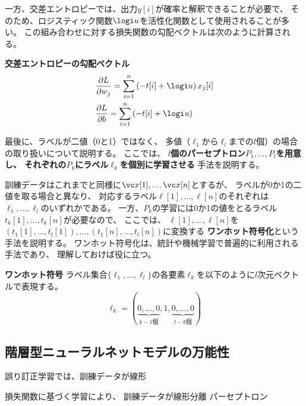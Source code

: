 一方、交差エントロピーでは、出力$y[i]$が確率と解釈できることが必要で、
そのため、ロジスティック関数$\logi u$を活性化関数として使用されることが多い。
この組み合わせに対する損失関数の勾配ベクトルは次のように計算される。
\begin{itembox}{\bf 交差エントロピーの勾配ベクトル}
  \begin{align*}
    &
    \frac{\partial L}{\partial w_j} = \sum_{i=1}^n \left(-t[i] + \logi u\right)x_j[i]
    \\&
    \frac{\partial L}{\partial b} = \sum_{i=1}^n \left(-t[i] + \logi u\right)
  \end{align*}
\end{itembox}

最後に、ラベルが二値（0と1）ではなく、
多値（$\ell_1$から$\ell_l$までの$l$個）の場合の取り扱いについて説明する。
ここでは、
\textbf{$l$個のパーセプトロン$P_1, \dots, P_l$を用意し、
それぞれの$P_k$にラベル$\ell_k$を個別に学習させる}
手法を説明する。

訓練データはこれまでと同様に$\vc x[1], \dots \vc x[n]$とするが、
ラベルが0か1の二値を取る場合と異なり、
対応するラベル$\ell[1], \dots, \ell[n]$のそれぞれは
$\ell_1, \dots, \ell_l$のいずれかである。
一方、$P_k$の学習には0か1の値をとるラベル$t_k[1], \dots, t_k[n]$が必要なので、
ここでは、
$\ell[1], \dots, \ell[n]$を
$(t_1[1], \dots, t_l[1]), \dots, (t_1[n], \dots, t_l[n])$に変換する
\textbf{ワンホット符号化}という手法を説明する。
ワンホット符号化は、統計や機械学習で普遍的に利用される手法であり、
理解しておけば役に立つ。
\begin{itembox}{\bf ワンホット符号}
  ラベル集合$\{\ell_1, \dots, \ell_l\}$の各要素$\ell_k$を以下のように$l$次元ベクトルで表現する。
  \[
    \ell_k = (\underbrace{0, \dots, 0}_{\text{$k-1$個}}, 1,
    \underbrace{0, \dots, 0}_{\text{$l-k$個}})
  \]
  
\end{itembox}

\subsection{階層型ニューラルネットモデルの万能性}
\label{sec:universality}

誤り訂正学習では、訓練データが線形

損失関数に基づく学習により、
訓練データが線形分離
パーセプトロン